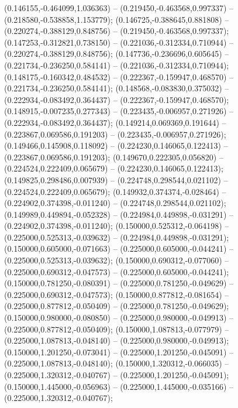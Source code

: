  (0.146155,-0.464099,1.036363) -- (0.219450,-0.463568,0.997337) -- (0.218580,-0.538858,1.153779);
 (0.146725,-0.388645,0.881808) -- (0.220274,-0.388129,0.848756) -- (0.219450,-0.463568,0.997337);
 (0.147253,-0.312821,0.738150) -- (0.221036,-0.312334,0.710944) -- (0.220274,-0.388129,0.848756);
 (0.147736,-0.236696,0.605645) -- (0.221734,-0.236250,0.584141) -- (0.221036,-0.312334,0.710944);
 (0.148175,-0.160342,0.484532) -- (0.222367,-0.159947,0.468570) -- (0.221734,-0.236250,0.584141);
 (0.148568,-0.083830,0.375032) -- (0.222934,-0.083492,0.364437) -- (0.222367,-0.159947,0.468570);
 (0.148915,-0.007235,0.277343) -- (0.223435,-0.006957,0.271926) -- (0.222934,-0.083492,0.364437);
 (0.149214,0.069369,0.191644) -- (0.223867,0.069586,0.191203) -- (0.223435,-0.006957,0.271926);
 (0.149466,0.145908,0.118092) -- (0.224230,0.146065,0.122413) -- (0.223867,0.069586,0.191203);
 (0.149670,0.222305,0.056820) -- (0.224524,0.222409,0.065679) -- (0.224230,0.146065,0.122413);
 (0.149825,0.298486,0.007939) -- (0.224748,0.298544,0.021102) -- (0.224524,0.222409,0.065679);
 (0.149932,0.374374,-0.028464) -- (0.224902,0.374398,-0.011240) -- (0.224748,0.298544,0.021102);
 (0.149989,0.449894,-0.052328) -- (0.224984,0.449898,-0.031291) -- (0.224902,0.374398,-0.011240);
 (0.150000,0.525312,-0.064198) -- (0.225000,0.525313,-0.039632) -- (0.224984,0.449898,-0.031291);
 (0.150000,0.605000,-0.071663) -- (0.225000,0.605000,-0.044241) -- (0.225000,0.525313,-0.039632);
 (0.150000,0.690312,-0.077060) -- (0.225000,0.690312,-0.047573) -- (0.225000,0.605000,-0.044241);
 (0.150000,0.781250,-0.080391) -- (0.225000,0.781250,-0.049629) -- (0.225000,0.690312,-0.047573);
 (0.150000,0.877812,-0.081654) -- (0.225000,0.877812,-0.050409) -- (0.225000,0.781250,-0.049629);
 (0.150000,0.980000,-0.080850) -- (0.225000,0.980000,-0.049913) -- (0.225000,0.877812,-0.050409);
 (0.150000,1.087813,-0.077979) -- (0.225000,1.087813,-0.048140) -- (0.225000,0.980000,-0.049913);
 (0.150000,1.201250,-0.073041) -- (0.225000,1.201250,-0.045091) -- (0.225000,1.087813,-0.048140);
 (0.150000,1.320312,-0.066035) -- (0.225000,1.320312,-0.040767) -- (0.225000,1.201250,-0.045091);
 (0.150000,1.445000,-0.056963) -- (0.225000,1.445000,-0.035166) -- (0.225000,1.320312,-0.040767);
